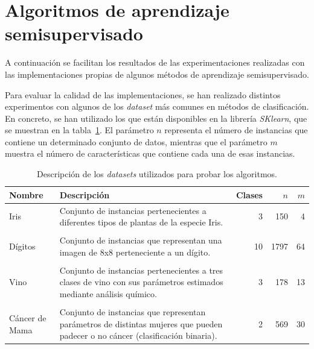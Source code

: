 
\section{Algoritmos de aprendizaje semisupervisado}

A continuación se facilitan los resultados de las experimentaciones realizadas con las implementaciones propias de algunos métodos de aprendizaje semisupervisado.

Para evaluar la calidad de las implementaciones, se han realizado distintos experimentos con algunos de los \textit{dataset} más comunes en métodos de clasificación. En concreto, se han utilizado los que están disponibles en la librería \textit{SKlearn}, que se muestran en la tabla~\ref{tabla_datasets_sklearn}. El parámetro $n$ representa el número de instancias que contiene un determinado conjunto de datos, mientras que el parámetro $m$ muestra el número de características que contiene cada una de esas instancias.

\begin{table}
	\small
	\begin{centering}
		\begin{tabular}{@{}p{4em} p{20em} r r r @{}}
			\toprule
			\textbf{Nombre} & \textbf{Descripción} & \textbf{Clases} & $n$ & $m$\\ 
			\midrule
			
			Iris & Conjunto de instancias pertenecientes a diferentes tipos de plantas de la especie Iris. & 3 & 150 & 4 \\\\
			Dígitos & Conjunto de instancias que representan una imagen de 8x8 perteneciente a un dígito. & 10 & 1797 & 64 \\\\
			Vino & Conjunto de instancias pertenecientes a tres clases de vino con sus parámetros estimados mediante análisis químico. & 3 & 178 & 13 \\\\
			Cáncer de Mama & Conjunto de instancias que representan parámetros de distintas mujeres que pueden padecer o no cáncer (clasificación binaria). & 2 & 569 & 30 \\
			\bottomrule
		\end{tabular}
	\end{centering}
	\caption[Experimentación: \textit{datasets} estándar]{Descripción de los \textit{datasets} utilizados para probar los algoritmos.}
	\label{tabla_datasets_sklearn}	
\end{table}



